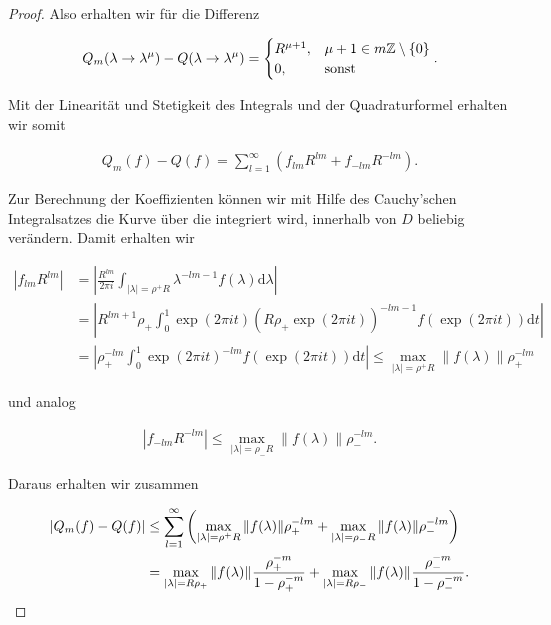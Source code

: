 \begin{proof}
Also erhalten wir für die Differenz

\begin{align*}
  Q_m(\lambda \to \lambda^\mu) - Q(\lambda \to \lambda^\mu) =
  \begin{cases}
    R^{\mu + 1}, & \mu + 1 \in m\mathbb{Z}\setminus\{0\} \\
    0, & \text{sonst}
  \end{cases}.
\end{align*}

Mit der Linearität und Stetigkeit des Integrals und der Quadraturformel erhalten wir somit

\begin{align*}
  Q_m(f) - Q(f) = \sum_{l=1}^{\infty}(f_{lm}R^{lm} + f_{-lm}R^{-lm}).
\end{align*}

Zur Berechnung der Koeffizienten können wir mit Hilfe des Cauchy'schen Integralsatzes
die Kurve über die integriert wird, innerhalb von $D$ beliebig verändern.
Damit erhalten wir

\begin{align*}
  |f_{lm}R^{lm}| &= \left|\frac{R^{lm}}{2\pi i}\int_{|\lambda| = \rho^+R}
  \lambda^{-lm -1}f(\lambda)\mathrm{d}\lambda\right| \\
  &= \left|R^{lm+1}\rho_+\int_0^1\exp(2\pi i t)
  (R\rho_+\exp(2\pi i t))^{-lm -1}f(\exp(2\pi i t))\mathrm{d}t\right| \\
  &= \left|\rho_+^{-lm}\int_0^1
  \exp(2\pi i t)^{-lm}f(\exp(2\pi i t))\mathrm{d}t\right|
  \leq \max_{|\lambda| = \rho^+R} \|f(\lambda)\|\rho_+^{-lm}
\end{align*}

und analog

\begin{align*}
  |f_{-lm}R^{-lm}| \leq \max_{|\lambda| = \rho_-R}\|f(\lambda)\|\rho_-^{-lm}.
\end{align*}

Daraus erhalten wir zusammen

\begin{align*}
  |Q_m(f) - Q(f)| &\leq \sum_{l=1}^{\infty}\left(\max_{|\lambda| = \rho^+R} \|f(\lambda)\|\rho_+^{-lm} +
  \max_{|\lambda| = \rho_-R}\|f(\lambda)\|\rho_-^{-lm}\right) \\
  &= \max_{{\left | \lambda \right |} = R \rho_+}
      {\left \| f(\lambda) \right \|}_{}
  \frac{\rho_+^{-m}}{1 - \rho_+^{-m}}
  +
  \max_{{\left | \lambda \right |} = R \rho_-}
      {\left \| f(\lambda) \right \|}_{}
  \frac{\rho_-^{-m}}{1 - \rho_-^{-m}}.
\end{align*}

\end{proof}

